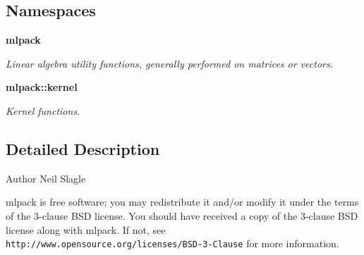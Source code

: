 \subsection*{Namespaces}
\begin{DoxyCompactItemize}
\item 
 {\bf mlpack}
\begin{DoxyCompactList}\small\item\em Linear algebra utility functions, generally performed on matrices or vectors. \end{DoxyCompactList}\item 
 {\bf mlpack\+::kernel}
\begin{DoxyCompactList}\small\item\em Kernel functions. \end{DoxyCompactList}\end{DoxyCompactItemize}


\subsection{Detailed Description}
\begin{DoxyAuthor}{Author}
Neil Slagle
\end{DoxyAuthor}
mlpack is free software; you may redistribute it and/or modify it under the terms of the 3-\/clause B\+SD license. You should have received a copy of the 3-\/clause B\+SD license along with mlpack. If not, see {\tt http\+://www.\+opensource.\+org/licenses/\+B\+S\+D-\/3-\/\+Clause} for more information. 